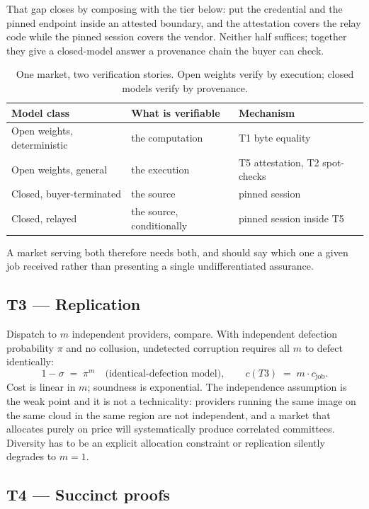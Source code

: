 \documentclass[11pt,a4paper]{article}
\begin{document}
That gap closes by composing with the tier below: put the credential and the
pinned endpoint inside an attested boundary, and the attestation covers the relay
code while the pinned session covers the vendor. Neither half suffices; together
they give a closed-model answer a provenance chain the buyer can check.

\begin{table}[h]
\centering
\begin{tabular}{lll}
\toprule
Model class & What is verifiable & Mechanism \\
\midrule
Open weights, deterministic & the computation & T1 byte equality \\
Open weights, general & the execution & T5 attestation, T2 spot-checks \\
Closed, buyer-terminated & the source & pinned session \\
Closed, relayed & the source, conditionally & pinned session inside T5 \\
\bottomrule
\end{tabular}
\caption{One market, two verification stories. Open weights verify by execution;
closed models verify by provenance.}
\end{table}

A market serving both therefore needs both, and should say which one a given job
received rather than presenting a single undifferentiated assurance.

\subsection{T3 --- Replication}

Dispatch to $m$ independent providers, compare. With independent defection
probability $\pi$ and no collusion, undetected corruption requires all $m$ to
defect identically:
\begin{equation}
1 - \sigma \;=\; \pi^{m} \quad\text{(identical-defection model)},
\qquad c(T3) \;=\; m \cdot c_{\text{job}}.
\end{equation}
Cost is linear in $m$; soundness is exponential. The independence assumption is
the weak point and it is not a technicality: providers running the same image on
the same cloud in the same region are not independent, and a market that
allocates purely on price will systematically produce correlated committees.
Diversity has to be an explicit allocation constraint or replication silently
degrades to $m = 1$.

\subsection{T4 --- Succinct proofs}
\end{document}
